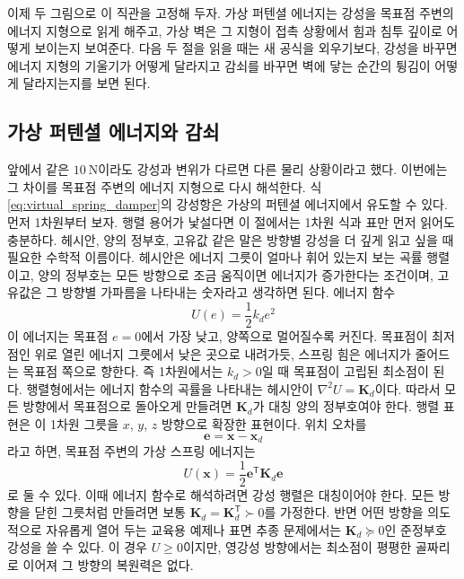 이제 두 그림으로 이 직관을 고정해 두자.
가상 퍼텐셜 에너지는 강성을 목표점 주변의 에너지 지형으로 읽게 해주고, 가상 벽은 그 지형이 접촉 상황에서 힘과 침투 깊이로 어떻게 보이는지 보여준다.
다음 두 절을 읽을 때는 새 공식을 외우기보다, 강성을 바꾸면 에너지 지형의 기울기가 어떻게 달라지고 감쇠를 바꾸면 벽에 닿는 순간의 튕김이 어떻게 달라지는지를 보면 된다.

\subsection{가상 퍼텐셜 에너지와 감쇠}

앞에서 같은 $10~\mathrm{N}$이라도 강성과 변위가 다르면 다른 물리 상황이라고 했다.
이번에는 그 차이를 목표점 주변의 에너지 지형으로 다시 해석한다.
식 \eqref{eq:virtual_spring_damper}의 강성항은 가상의 퍼텐셜 에너지에서 유도할 수 있다.
먼저 1차원부터 보자.
행렬 용어가 낯설다면 이 절에서는 1차원 식과 표만 먼저 읽어도 충분하다.
헤시안, 양의 정부호, 고유값 같은 말은 방향별 강성을 더 깊게 읽고 싶을 때 필요한 수학적 이름이다.
헤시안은 에너지 그릇이 얼마나 휘어 있는지 보는 곡률 행렬이고, 양의 정부호는 모든 방향으로 조금 움직이면 에너지가 증가한다는 조건이며, 고유값은 그 방향별 가파름을 나타내는 숫자라고 생각하면 된다.
에너지 함수
\begin{equation}
  U(e)=\frac{1}{2}k_de^2
\end{equation}
이 에너지는 목표점 $e=0$에서 가장 낮고, 양쪽으로 멀어질수록 커진다.
목표점이 최저점인 위로 열린 에너지 그릇에서 낮은 곳으로 내려가듯, 스프링 힘은 에너지가 줄어드는 목표점 쪽으로 향한다.
즉 1차원에서는 $k_d>0$일 때 목표점이 고립된 최소점이 된다.
행렬형에서는 에너지 함수의 곡률을 나타내는 헤시안이 $\nabla^2U=\bm{K}_d$이다.
따라서 모든 방향에서 목표점으로 돌아오게 만들려면 $\bm{K}_d$가 대칭 양의 정부호여야 한다.
행렬 표현은 이 1차원 그릇을 $x$, $y$, $z$ 방향으로 확장한 표현이다.
위치 오차를
\begin{equation}
  \bm{e}=\bm{x}-\bm{x}_d
\end{equation}
라고 하면, 목표점 주변의 가상 스프링 에너지는
\begin{equation}
  U(\bm{x})
  =
  \frac{1}{2}\bm{e}^{\mathsf{T}}\bm{K}_d\bm{e}
\end{equation}
로 둘 수 있다.
이때 에너지 함수로 해석하려면 강성 행렬은 대칭이어야 한다.
모든 방향을 닫힌 그릇처럼 만들려면 보통 $\bm{K}_d=\bm{K}_d^{\mathsf{T}}\succ0$를 가정한다.
반면 어떤 방향을 의도적으로 자유롭게 열어 두는 교육용 예제나 표면 추종 문제에서는 $\bm{K}_d\succeq0$인 준정부호 강성을 쓸 수 있다.
이 경우 $U\ge0$이지만, 영강성 방향에서는 최소점이 평평한 골짜리로 이어져 그 방향의 복원력은 없다.

